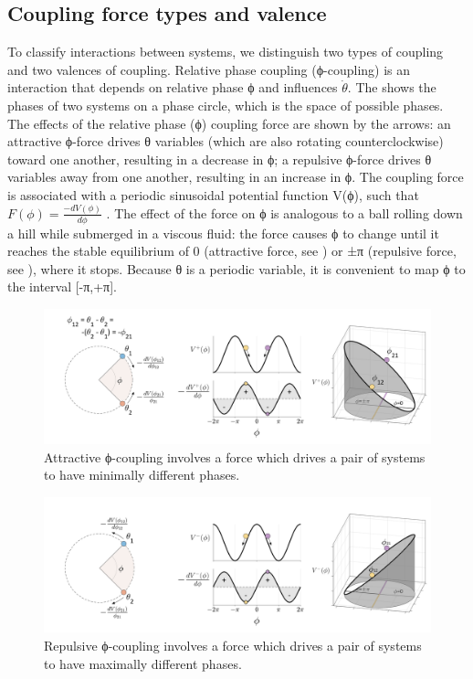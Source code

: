 \subsection{Coupling force types and valence} 

To classify interactions between systems, we distinguish two types of coupling and two valences of coupling. Relative phase coupling (ϕ-coupling) is an interaction that depends on relative phase ϕ and influences $\dot{θ}$. The {} shows the phases of two systems on a phase circle, which is the space of possible phases. The effects of the relative phase (ϕ) coupling force are shown by the arrows: an attractive ϕ-force drives θ variables (which are also rotating counterclockwise) toward one another, resulting in a decrease in ϕ; a repulsive ϕ-force drives θ variables away from one another, resulting in an increase in ϕ. The coupling force is associated with a periodic sinusoidal potential function V(ϕ), such that  $F\left(\phi \right)=\frac{-{dV}\left(\phi \right)}{{d\phi} }$ . The effect of the force on ϕ is analogous to a ball rolling down a hill while submerged in a viscous fluid: the force causes ϕ to change until it reaches the stable equilibrium of 0 (attractive force, see {}) or ±π (repulsive force, see {}), where it stops. Because θ is a periodic variable, it is convenient to map ϕ to the interval [-π,+π]. 

  
\begin{figure}
\includegraphics[width=\textwidth]{figures/Tilsen-img18.png}
\caption{Attractive ϕ-coupling involves a force which drives a pair of systems to have minimally different phases.}
\label{fig:2:11}
\end{figure}
 

  
\begin{figure}
\includegraphics[width=\textwidth]{figures/Tilsen-img19.png}
\caption{Repulsive ϕ-coupling involves a force which drives a pair of systems to have maximally different phases.}
\label{fig:2:12}
\end{figure}
 

